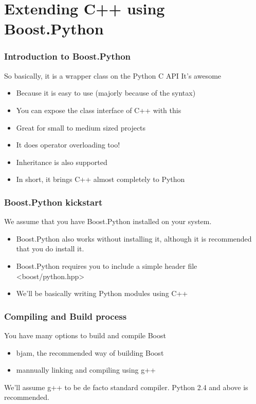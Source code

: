 \documentclass{beamer}
\begin{document}
\section{Extending C++ using Boost.Python}
\label{sec-2}
\begin{frame}
\frametitle{Introduction to Boost.Python}
\label{sec-2_1}

  So basically, it is a wrapper class on the Python C API
  It's awesome

\begin{itemize}
\item Because it is easy to use (majorly because of the syntax)
\item You can expose the class interface of C++ with this
\item Great for small to medium sized projects
\item It does operator overloading too!
\item Inheritance is also supported
\item In short, it brings C++ almost completely to Python
\end{itemize}
\end{frame}
\begin{frame}
\frametitle{Boost.Python kickstart}
\label{sec-2_2}

   We assume that you have Boost.Python installed on your system.

\begin{itemize}
\item Boost.Python also works without installing it, although it is recommended that you do install it.
\item Boost.Python requires you to include a simple header file <boost/python.hpp>
\item We'll be basically writing Python modules using C++
\end{itemize}
\end{frame}
\begin{frame}
\frametitle{Compiling and Build process}
\label{sec-2_3}

   You have many options to build and compile Boost

\begin{itemize}
\item bjam, the recommended way of building Boost
\item mannually linking and compiling using g++
\end{itemize}
   We'll assume g++ to be de facto standard compiler. Python 2.4 and above is recommended.
   
\end{frame}
\end{document}
